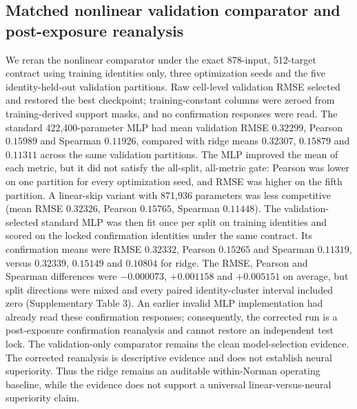 \documentclass[10pt]{article}
\begin{document}



\subsection{Matched nonlinear validation comparator and post-exposure reanalysis}
We reran the nonlinear comparator under the exact 878-input, 512-target contract using training identities only, three optimization seeds and the five identity-held-out validation partitions. Raw cell-level validation RMSE selected and restored the best checkpoint; training-constant columns were zeroed from training-derived support masks, and no confirmation responses were read. The standard 422,400-parameter MLP had mean validation RMSE $0.32299$, Pearson $0.15989$ and Spearman $0.11926$, compared with ridge means $0.32307$, $0.15879$ and $0.11311$ across the same validation partitions. The MLP improved the mean of each metric, but it did not satisfy the all-split, all-metric gate: Pearson was lower on one partition for every optimization seed, and RMSE was higher on the fifth partition. A linear-skip variant with 871,936 parameters was less competitive (mean RMSE $0.32326$, Pearson $0.15765$, Spearman $0.11448$). The validation-selected standard MLP was then fit once per split on training identities and scored on the locked confirmation identities under the same contract. Its confirmation means were RMSE $0.32332$, Pearson $0.15265$ and Spearman $0.11319$, versus $0.32339$, $0.15149$ and $0.10804$ for ridge. The RMSE, Pearson and Spearman differences were $-0.000073$, $+0.001158$ and $+0.005151$ on average, but split directions were mixed and every paired identity-cluster interval included zero (Supplementary Table 3). An earlier invalid MLP implementation had already read these confirmation responses; consequently, the corrected run is a post-exposure confirmation reanalysis and cannot restore an independent test lock. The validation-only comparator remains the clean model-selection evidence. The corrected reanalysis is descriptive evidence and does not establish neural superiority. Thus the ridge remains an auditable within-Norman operating baseline, while the evidence does not support a universal linear-versus-neural superiority claim.
\end{document}

